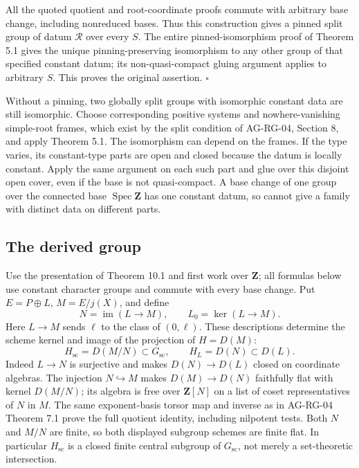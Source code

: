\documentclass[11pt,a4paper,openany]{report}
\begin{document}
All the quoted quotient and root-coordinate proofs commute with arbitrary base change, including nonreduced bases. Thus this construction gives a pinned split group of datum \(\mathcal R\) over every \(S\). The entire pinned-isomorphism proof of Theorem 5.1 gives the unique pinning-preserving isomorphism to any other group of that specified constant datum; its non-quasi-compact gluing argument applies to arbitrary \(S\). This proves the original assertion. \(\square\)

Without a pinning, two globally split groups with isomorphic constant data are still isomorphic. Choose corresponding positive systems and nowhere-vanishing simple-root frames, which exist by the split condition of AG-RG-04, Section 8, and apply Theorem 5.1. The isomorphism can depend on the frames. If the type varies, its constant-type parts are open and closed because the datum is locally constant. Apply the same argument on each such part and glue over this disjoint open cover, even if the base is not quasi-compact. A base change of one group over the connected base \(\operatorname{Spec}\mathbf Z\) has one constant datum, so cannot give a family with distinct data on different parts.

\subsection{The derived group}\label{AG-RG-05-the-derived-group}

Use the presentation of Theorem 10.1 and first work over \(\mathbf Z\); all formulas below use constant character groups and commute with every base change. Put \(E=P\oplus L\), \(M=E/j(X)\), and define \[
 N=\operatorname{im}(L\longrightarrow M),\qquad
 L_0=\ker(L\longrightarrow M).
\] Here \(L\to M\) sends \(\ell\) to the class of \((0,\ell)\). These descriptions determine the scheme kernel and image of the projection of \(H=D(M)\): \[
 H_{\mathrm{sc}}=D(M/N)\subset G_{\mathrm{sc}},\qquad
 H_L=D(N)\subset D(L).
\] Indeed \(L\to N\) is surjective and makes \(D(N)\to D(L)\) closed on coordinate algebras. The injection \(N\hookrightarrow M\) makes \(D(M)\to D(N)\) faithfully flat with kernel \(D(M/N)\); its algebra is free over \(\mathbf Z[N]\) on a list of coset representatives of \(N\) in \(M\). The same exponent-basis torsor map and inverse as in AG-RG-04 Theorem 7.1 prove the full quotient identity, including nilpotent tests. Both \(N\) and \(M/N\) are finite, so both displayed subgroup schemes are finite flat. In particular \(H_{\mathrm{sc}}\) is a closed finite central subgroup of \(G_{\mathrm{sc}}\), not merely a set-theoretic intersection.
\end{document}
